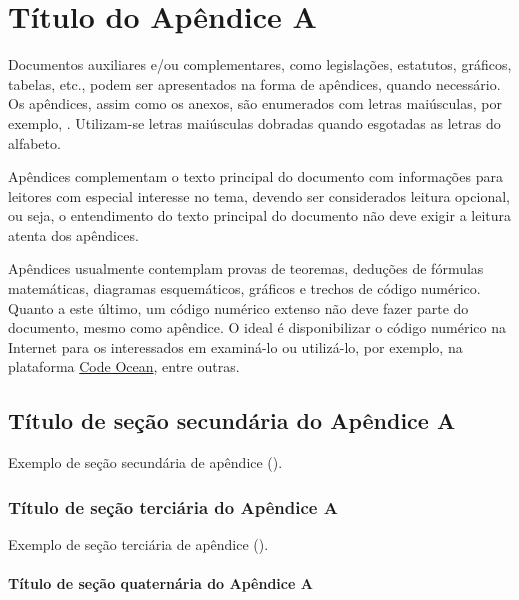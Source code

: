 
\graphicspath{%
  {./Post-Textual/}%
}

\chapter{Título do Apêndice A}%
\label{chpt:apx-a}

Documentos auxiliares e/ou complementares, como legislações, estatutos, gráficos, tabelas, etc., podem ser apresentados na forma de apêndices, quando necessário.
Os apêndices, assim como os anexos, são enumerados com letras maiúsculas, por exemplo, .
Utilizam-se letras maiúsculas dobradas quando esgotadas as letras do alfabeto.

Apêndices complementam o texto principal do documento com informações para leitores com especial interesse no tema, devendo ser considerados leitura opcional, ou seja, o entendimento do texto principal do documento não deve exigir a leitura atenta dos apêndices.

Apêndices usualmente contemplam provas de teoremas, deduções de fórmulas matemáticas, diagramas esquemáticos, gráficos e trechos de código numérico.
Quanto a este último, um código numérico extenso não deve fazer parte do documento, mesmo como apêndice.
O ideal é disponibilizar o código numérico na Internet para os interessados em examiná-lo ou utilizá-lo, por exemplo, na plataforma \href{https://codeocean.com/}{Code Ocean\LinkIcon}, entre outras.

\section{Título de seção secundária do Apêndice A}%
\label{sect:apx-a2}

Exemplo de seção secundária de apêndice ().

\subsection{Título de seção terciária do Apêndice A}%
\label{ssect:apx-a3}

Exemplo de seção terciária de apêndice ().

\subsubsection{Título de seção quaternária do Apêndice A}%
\label{sssect:apx-a4}

